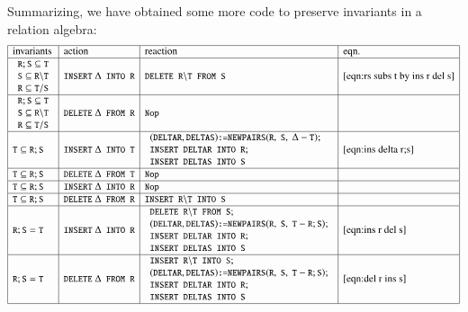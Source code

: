 \documentclass{elsarticle}
\begin{document}
	Summarizing, we have obtained some more code to preserve invariants in a relation algebra:
\[\begin{array}{|l|l|l|l|}
\hline
\text{invariants}&\text{action}&\text{reaction}&\text{eqn.}\\ \hline
\begin{array}{l}
\code{R};\code{S}\subs\code{T}\\
\code{S}\subs\code{R}\backslash\code{T}\\
\code{R}\subs\code{T}\slash\code{S}
\end{array}&\code{INSERT}\ \Delta\code{ INTO R}&\code{DELETE R}\backslash\code{T FROM S}&\ref{eqn:rs subs t by ins r del s}\\ \hline
\begin{array}{l}
\code{R};\code{S}\subs\code{T}\\
\code{S}\subs\code{R}\backslash\code{T}\\
\code{R}\subs\code{T}\slash\code{S}
\end{array}&\code{DELETE}\ \Delta\code{ FROM R}&\code{Nop}&\\ \hline
\code{T}\subs\code{R};\code{S}&\code{INSERT}\ \Delta\code{ INTO T}&
\begin{array}{l}
(\code{DELTAR},\code{DELTAS})\code{:=NEWPAIRS}(\code{R},\ \code{S},\ \Delta-\code{T});\\
\code{INSERT DELTAR INTO R};\\
\code{INSERT DELTAS INTO S}
\end{array}&\ref{eqn:ins delta r;s}\\ \hline
\code{T}\subs\code{R};\code{S}&\code{DELETE}\ \Delta\code{ FROM T}&\code{Nop}&\\ \hline
\code{T}\subs\code{R};\code{S}&\code{INSERT}\ \Delta\code{ INTO R}&\code{Nop}&\\ \hline
\code{T}\subs\code{R};\code{S}&\code{DELETE}\ \Delta\code{ FROM R}&\code{INSERT R}\backslash\code{T INTO S}&\\ \hline
\code{R};\code{S}=\code{T}&\code{INSERT}\ \Delta\code{ INTO R}&
\begin{array}{l}
\code{DELETE R}\backslash\code{T FROM S};\\
(\code{DELTAR},\code{DELTAS})\code{:=NEWPAIRS}(\code{R},\ \code{S},\ \code{T}-\code{R};\code{S});\\
\code{INSERT DELTAR INTO R};\\
\code{INSERT DELTAS INTO S}
\end{array}&\ref{eqn:ins r del s}\\ \hline
\code{R};\code{S}=\code{T}&\code{DELETE}\ \Delta\code{ FROM R}&
\begin{array}{l}
\code{INSERT R}\backslash\code{T INTO S};\\
(\code{DELTAR},\code{DELTAS})\code{:=NEWPAIRS}(\code{R},\ \code{S},\ \code{T}-\code{R};\code{S});\\
\code{INSERT DELTAR INTO R};\\
\code{INSERT DELTAS INTO S}
\end{array}&\ref{eqn:del r ins s}\\ \hline
\end{array}\]
\end{document}

